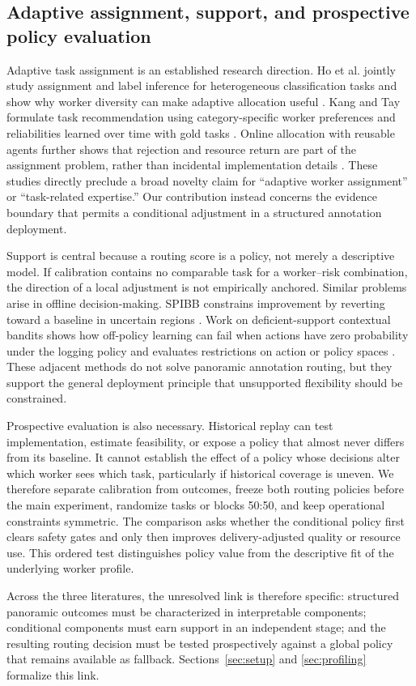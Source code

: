 \subsection{Adaptive assignment, support, and prospective policy evaluation}

Adaptive task assignment is an established research direction. Ho et al. jointly study assignment and label inference for heterogeneous classification tasks and show why worker diversity can make adaptive allocation useful \cite{ho2013adaptive}. Kang and Tay formulate task recommendation using category-specific worker preferences and reliabilities learned over time with gold tasks \cite{kang2018recommendation}. Online allocation with reusable agents further shows that rejection and resource return are part of the assignment problem, rather than incidental implementation details \cite{sumita2022reusable}. These studies directly preclude a broad novelty claim for ``adaptive worker assignment'' or ``task-related expertise.'' Our contribution instead concerns the evidence boundary that permits a conditional adjustment in a structured annotation deployment.

Support is central because a routing score is a policy, not merely a descriptive model. If calibration contains no comparable task for a worker--risk combination, the direction of a local adjustment is not empirically anchored. Similar problems arise in offline decision-making. SPIBB constrains improvement by reverting toward a baseline in uncertain regions \cite{laroche2019spibb}. Work on deficient-support contextual bandits shows how off-policy learning can fail when actions have zero probability under the logging policy and evaluates restrictions on action or policy spaces \cite{sachdeva2020support}. These adjacent methods do not solve panoramic annotation routing, but they support the general deployment principle that unsupported flexibility should be constrained.

Prospective evaluation is also necessary. Historical replay can test implementation, estimate feasibility, or expose a policy that almost never differs from its baseline. It cannot establish the effect of a policy whose decisions alter which worker sees which task, particularly if historical coverage is uneven. We therefore separate calibration from outcomes, freeze both routing policies before the main experiment, randomize tasks or blocks 50:50, and keep operational constraints symmetric. The comparison asks whether the conditional policy first clears safety gates and only then improves delivery-adjusted quality or resource use. This ordered test distinguishes policy value from the descriptive fit of the underlying worker profile.

Across the three literatures, the unresolved link is therefore specific: structured panoramic outcomes must be characterized in interpretable components; conditional components must earn support in an independent stage; and the resulting routing decision must be tested prospectively against a global policy that remains available as fallback. Sections~\ref{sec:setup} and \ref{sec:profiling} formalize this link.
